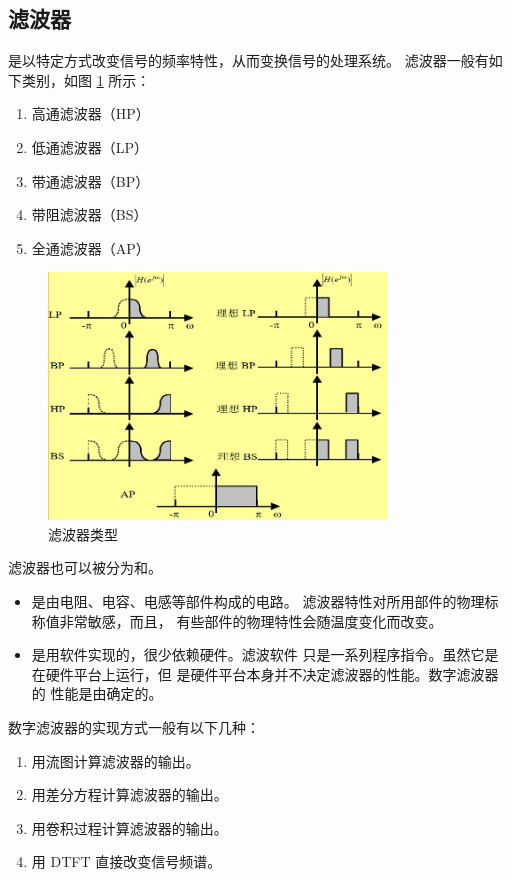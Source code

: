 \subsection{滤波器}

\begin{definition}
    是以特定方式改变信号的频率特性，从而变换信号的处理系统。
    滤波器一般有如下类别，如图 \ref{fig:filter_types} 所示：
    \begin{enumerate}[label=(\arabic*)]
        \item 高通滤波器（HP）
        \item 低通滤波器（LP）
        \item 带通滤波器（BP）
        \item 带阻滤波器（BS）
        \item 全通滤波器（AP）
    \end{enumerate}
    \begin{figure}[H]
        \centering
        \includegraphics[width=0.8\textwidth]{chap4/img/filter_types.png}
        \caption{滤波器类型}
        \label{fig:filter_types}
    \end{figure}

    滤波器也可以被分为和。
    \begin{itemize}
        \item {}是由电阻、电容、电感等部件构成的电路。
            滤波器特性对所用部件的物理标称值非常敏感，而且，
            有些部件的物理特性会随温度变化而改变。
        \item {}是用软件实现的，很少依赖硬件。滤波软件
            只是一系列程序指令。虽然它是在硬件平台上运行，但
            是硬件平台本身并不决定滤波器的性能。数字滤波器的
            性能是由确定的。
    \end{itemize}
    数字滤波器的实现方式一般有以下几种：
    \begin{enumerate}
        \item 用流图计算滤波器的输出。
        \item 用差分方程计算滤波器的输出。
        \item 用卷积过程计算滤波器的输出。
        \item 用 DTFT 直接改变信号频谱。
    \end{enumerate}
\end{definition}

